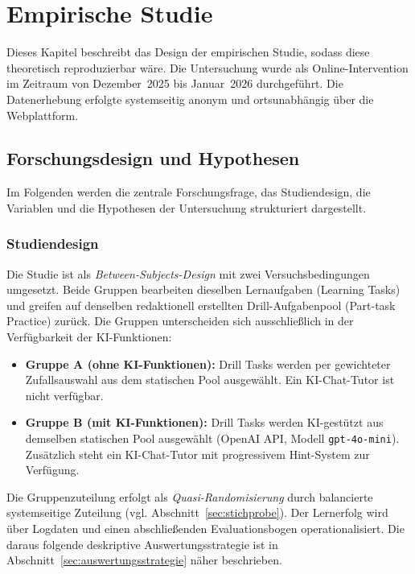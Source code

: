 \chapter{\textbf{Empirische Studie}}\label{ch:studie}

Dieses Kapitel beschreibt das Design der empirischen Studie, sodass diese theoretisch reproduzierbar wäre.
Die Untersuchung wurde als Online-Intervention im Zeitraum von Dezember~2025 bis Januar~2026 durchgeführt. Die Datenerhebung erfolgte systemseitig anonym und ortsunabhängig über die Webplattform.

\section{Forschungsdesign und Hypothesen}\label{sec:forschungsdesign}

Im Folgenden werden die zentrale Forschungsfrage, das Studiendesign, die Variablen und die Hypothesen der Untersuchung strukturiert dargestellt.

\subsection{Studiendesign}\label{subsec:studiendesign}

Die Studie ist als \textit{Between-Subjects-Design} mit zwei Versuchsbedingungen umgesetzt. Beide Gruppen bearbeiten dieselben Lernaufgaben (Learning Tasks) und greifen auf denselben redaktionell erstellten Drill-Aufgabenpool (Part-task Practice) zurück. Die Gruppen unterscheiden sich ausschließlich in der Verfügbarkeit der KI-Funktionen:

\begin{itemize}
    \item \textbf{Gruppe A (ohne KI-Funktionen):} Drill Tasks werden per gewichteter Zufallsauswahl aus dem statischen Pool ausgewählt. Ein KI-Chat-Tutor ist nicht verfügbar.
    \item \textbf{Gruppe B (mit KI-Funktionen):} Drill Tasks werden KI-gestützt aus demselben statischen Pool ausgewählt (OpenAI API, Modell \texttt{gpt-4o-mini}). Zusätzlich steht ein KI-Chat-Tutor mit progressivem Hint-System zur Verfügung.
\end{itemize}

Die Gruppenzuteilung erfolgt als \textit{Quasi-Randomisierung} durch balancierte systemseitige Zuteilung (vgl. Abschnitt~\ref{sec:stichprobe}). Der Lernerfolg wird über Logdaten und einen abschließenden Evaluationsbogen operationalisiert. Die daraus folgende deskriptive Auswertungsstrategie ist in Abschnitt~\ref{sec:auswertungsstrategie} näher beschrieben.

